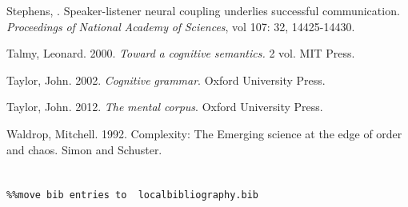 \begin{stylereferences}
Stephens, \citealt{GregEtAl2010}. Speaker-listener neural coupling underlies successful communication. \textit{Proceedings} \textit{of} \textit{National} \textit{Academy} \textit{of} \textit{Sciences}, vol 107: 32, 14425-14430.
\end{stylereferences}

\begin{stylereferences}
Talmy, Leonard. 2000. \textit{Toward} \textit{a} \textit{cognitive} \textit{semantics.} 2 vol. MIT Press.
\end{stylereferences}

\begin{stylereferences}
Taylor, John. 2002. \textit{Cognitive} \textit{grammar}. Oxford University Press.
\end{stylereferences}

\begin{stylereferences}
Taylor, John. 2012. \textit{The} \textit{mental} \textit{corpus}. Oxford University Press.
\end{stylereferences}

\begin{stylereferences}
Waldrop, Mitchell. 1992. Complexity: The Emerging science at the edge of order and chaos. Simon and Schuster. 
\end{stylereferences}
\section{}

\begin{verbatim}%%move bib entries to  localbibliography.bib
\end{verbatim} 